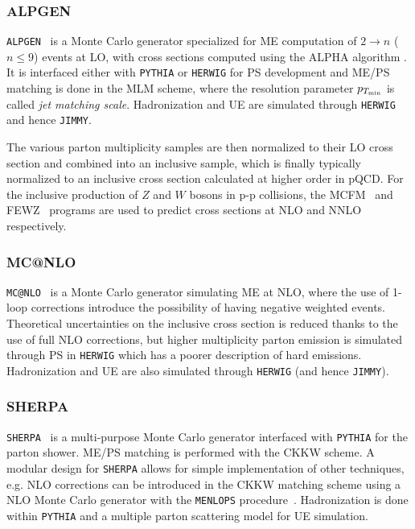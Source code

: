 \subsubsection*{ALPGEN}

\texttt{ALPGEN}~\cite{ALPGEN} is a Monte Carlo generator specialized for
ME computation of $2 \to n$ ($n\leq 9$) events at LO, with cross sections 
computed using the ALPHA algorithm \cite{ALPGEN_0}. It is interfaced either
with \texttt{PYTHIA} or \texttt{HERWIG} for PS development and ME/PS matching
is done in the MLM scheme, where the resolution parameter $p_{T_{\rm min}}$ is
called {\it jet matching scale}.
Hadronization and UE are simulated through \texttt{HERWIG}
and hence \texttt{JIMMY}.

The various parton multiplicity samples are then normalized to their LO cross section
and combined into an inclusive sample, which is finally typically normalized 
to an inclusive cross section calculated at higher order in pQCD. 
For the inclusive production of $Z$ and $W$ bosons in p-p collisions, the 
MCFM~\cite{MCFM} and FEWZ~\cite{Gavin:2010az} programs are used to predict 
cross sections at NLO and NNLO respectively.


\subsubsection*{MC@NLO}

\texttt{MC@NLO}~\cite{mcatnlo} is a Monte Carlo generator simulating ME at
NLO, where the use of 1-loop corrections introduce the possibility of having
negative weighted events. Theoretical uncertainties on the inclusive cross
section is reduced thanks to the use of full NLO corrections, but higher multiplicity
parton emission is simulated through PS in \texttt{HERWIG} which has
a poorer description of hard emissions. 
Hadronization and UE are also simulated through \texttt{HERWIG}
(and hence \texttt{JIMMY}).

\subsubsection*{SHERPA}

\texttt{SHERPA}~\cite{sherpa} is a multi-purpose Monte Carlo generator
interfaced with \texttt{PYTHIA} for the parton shower. ME/PS matching
is performed with the CKKW scheme.
A modular design for \texttt{SHERPA} allows for  simple implementation
of other techniques, e.g. NLO corrections can be introduced in the
CKKW matching scheme using a NLO Monte Carlo generator with the
\texttt{MENLOPS} procedure~\cite{MENLOPS}.
Hadronization is done within \texttt{PYTHIA} and a multiple parton 
scattering model for UE simulation.


